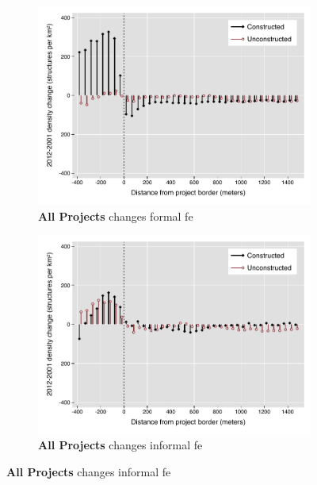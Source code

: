 \documentclass[12pt]{article}
\begin{document}
\begin{figure}
        \centering
        \begin{subfigure}[b]{0.48\textwidth}
            \caption[Network2]%
            {{\footnotesize \textbf{All Projects} changes formal fe }}    
            \label{fig:prefor}
            \centering
            \includegraphics[width=\textwidth,trim={0.3cm .3cm 0.1cm 0cm}, clip=true]{figures/bblu_for_fe_rawchanges_4_sp_postk.pdf}

        \end{subfigure}
        \hfill
        \begin{subfigure}[b]{0.48\textwidth}  
                    \caption[]%
            {{\footnotesize \textbf{All Projects} changes informal  fe }}      
            \label{fig:preinf}
            \centering 
            \includegraphics[width=\textwidth,trim={0.3cm .3cm 0.1cm 0cm}, clip=true]{figures/bblu_inf_fe_rawchanges_4_sp_postk.pdf}


\end{subfigure}
\end{figure}
\end{document}
